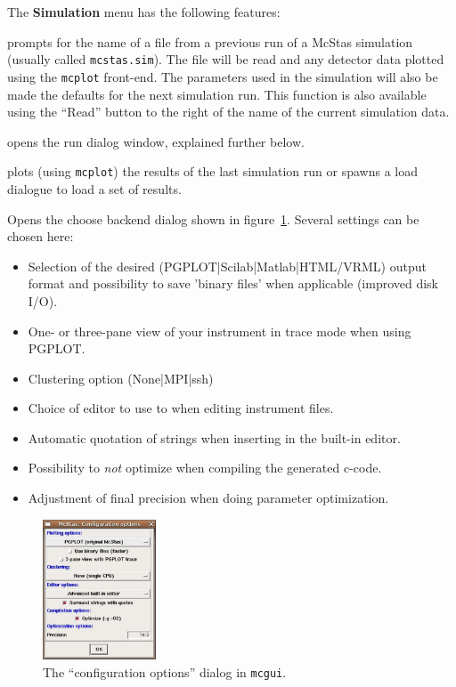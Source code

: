 \noindent The {\bf Simulation} menu has the following features:
\begin{description} 
\item[Read old simulation] prompts for the name of a file
  from a previous run of a McStas simulation (usually called
  \verb+mcstas.sim+). The file will be read and any detector data
  plotted using the \verb+mcplot+ front-end. The parameters used in the
  simulation will also be made the defaults for the next simulation
  run. This function is also available using the ``Read'' button to the
  right of the name of the current simulation data.
\item[Run simulation] opens the run dialog window, explained
  further below.
\item[Plot results] plots (using \verb+mcplot+) the results of the
  last simulation run or spawns a load dialogue to load a set of results.
\item[Configuration options] Opens the choose backend dialog shown in
  figure~\ref{fig:mcgui-choose}. Several settings can be chosen here:
\begin{itemize}
  \item Selection of  the desired (PGPLOT|Scilab|Matlab|HTML/VRML) output
    format and possibility to save 'binary files' when
  applicable (improved disk I/O).
  \item One- or three-pane view of your instrument in trace mode when
    using PGPLOT.
  \item Clustering option (None|MPI|ssh)
  \item Choice of editor to use to when editing instrument files.
  \item Automatic quotation of strings when inserting in the built-in
    editor.
  \item Possibility to \emph{not} optimize when compiling the
    generated c-code.
  \item Adjustment of final precision when doing parameter optimization.
\end{itemize}
\end{description}

\begin{figure}[htb!]
  \begin{center}
    \includegraphics[width=0.3\textwidth]{figures/choose_backend.eps}
  \end{center}
\caption{The ``configuration options'' dialog in \texttt{mcgui}.}
\label{fig:mcgui-choose}
\end{figure}


